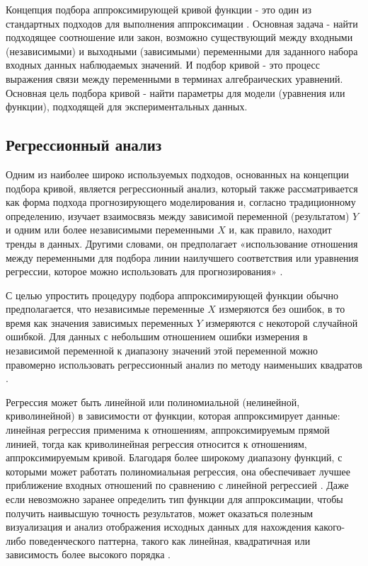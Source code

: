 Концепция подбора аппроксимирующей кривой функции - это один из стандартных подходов для выполнения аппроксимации \cite{article:behav_form_extr}. Основная задача - найти подходящее соотношение или закон, возможно существующий между входными (независимыми) и выходными (зависимыми) переменными для заданного набора входных данных наблюдаемых значений. И подбор кривой - это процесс выражения связи между переменными в терминах алгебраических уравнений. Основная цель подбора кривой - найти параметры для модели (уравнения или функции), подходящей для экспериментальных данных.

\subsection{Регрессионный анализ}

Одним из наиболее широко используемых подходов, основанных на концепции подбора кривой, является регрессионный анализ, который также рассматривается как форма подхода прогнозирующего моделирования и, согласно традиционному определению, изучает взаимосвязь между зависимой переменной (результатом) $Y$ и одним или более независимыми переменными $X$ и, как правило, находит тренды в данных. Другими словами, он предполагает «использование отношения между переменными для подбора линии наилучшего соответствия или уравнения регрессии, которое можно использовать для прогнозирования» \cite{online:intro_lr_pr}.

С целью упростить процедуру подбора аппроксимирующей функции обычно предполагается, что независимые переменные $X$ измеряются без ошибок, в то время как значения зависимых переменных $Y$ измеряются с некоторой случайной ошибкой. Для данных с небольшим отношением ошибки измерения в независимой переменной к диапазону значений этой переменной можно правомерно использовать регрессионный анализ по методу наименьших квадратов \cite{article:behav_form_extr}.

Регрессия может быть линейной или полиномиальной (нелинейной, криволинейной) в зависимости от функции, которая аппроксимирует данные: линейная регрессия применима к отношениям, аппроксимируемым прямой линией, тогда как криволинейная регрессия относится к отношениям,  аппроксимируемым кривой. Благодаря более широкому диапазону функций, с которыми может работать полиномиальная регрессия, она обеспечивает лучшее приближение входных отношений по сравнению с линейной регрессией \cite{online:intro_lr_pr}. Даже если невозможно заранее определить тип функции для аппроксимации, чтобы получить наивысшую точность результатов, может оказаться полезным визуализация и анализ отображения исходных данных для нахождения какого-либо поведенческого паттерна, такого как линейная, квадратичная или зависимость более высокого порядка \cite{article:behav_form_extr}.

